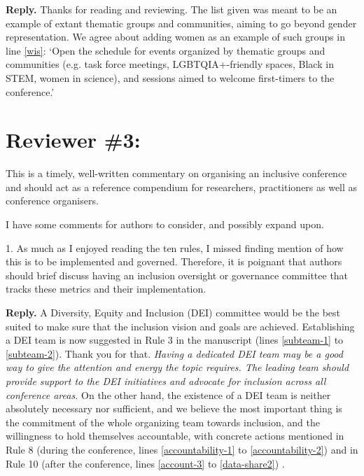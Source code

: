 \documentclass{article}
\newenvironment{Reply}{\noindent\color{BlueViolet}\textbf{Reply.}}{\vspace{1em}}
\begin{document}
\begin{Reply}
    Thanks for reading and reviewing. The list given was meant to be an example of extant thematic groups and communities, aiming to go beyond gender representation.
    We agree about adding women as an example of such groups in line \ref{wis}:
    `Open the schedule for events organized by thematic groups and communities (e.g. task force meetings, LGBTQIA+-friendly spaces, Black in STEM, women in science), and sessions aimed to welcome first-timers to the conference.'
\end{Reply}

\section*{Reviewer \#3:} 
This is a timely, well-written commentary on organising an inclusive conference and should act as a reference compendium for researchers, practitioners as well as conference organisers.

I have some comments for authors to consider, and possibly expand upon.

1. As much as I enjoyed reading the ten rules, I missed finding mention of how this is to be implemented and governed. Therefore, it is poignant that authors should brief discuss having an inclusion oversight or governance committee that tracks these metrics and their implementation.

\begin{Reply}
    A Diversity, Equity and Inclusion (DEI) committee would be the best suited to make sure that the inclusion vision and goals are achieved. 
    Establishing a DEI team is now suggested in Rule 3 in the manuscript (lines \ref{subteam-1} to \ref{subteam-2}). Thank you for that. 
    \textit{ 
    Having a dedicated DEI team may be a good way to give the attention and energy the topic requires.
    The leading team should provide support to the DEI initiatives and advocate for inclusion across all conference areas.}
    On the other hand, the existence of a DEI team is neither absolutely necessary nor sufficient, and we believe the most important thing is the commitment of the 
    whole organizing team towards inclusion, and the willingness to hold themselves accountable, with concrete actions mentioned in Rule 8 (during the conference, lines \ref{accountability-1} to \ref{accountability-2})  and in Rule 10 (after the conference, lines \ref{account-3} to \ref{data-share2}) .
    
\end{Reply}
\end{document}

